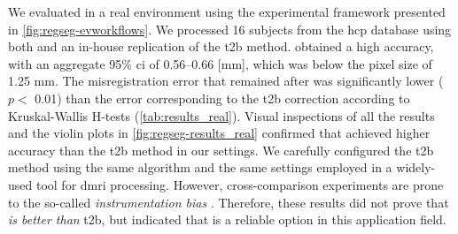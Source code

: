 We evaluated \regseg{} in a real environment using the experimental framework presented
  in \autoref{fig:regseg-evworkflows}.
We processed 16 subjects from the \gls*{hcp} database using both \regseg{}
  and an in-house replication of the \acrfull*{t2b} method.
\Regseg{} obtained a high accuracy, with an aggregate 95\% \gls*{ci} of 0.56--0.66 [mm], which was
  below the pixel size of 1.25 mm.
The misregistration error that remained after \regseg{} was significantly lower ($p <$ 0.01) than the
  error corresponding to the \gls*{t2b} correction according to Kruskal-Wallis H-tests
  (\autoref{tab:results_real}).
Visual inspections of all the results  and the violin plots in
  \autoref{fig:regseg-results_real} confirmed that \regseg{} achieved higher accuracy
  than the \gls*{t2b} method in our settings.
We carefully configured the \gls*{t2b} method using the same algorithm and the
  same settings employed in a widely-used tool for \gls*{dmri} processing.
However, cross-comparison experiments are prone to the so-called \emph{instrumentation bias}
  \citep{tustison_instrumentation_2013}.
Therefore, these results did not prove that \regseg{} \emph{is better than} \gls*{t2b},
  but indicated that \regseg{} is a reliable option in this application field.
%


